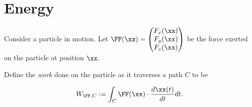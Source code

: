 \documentclass{article}
\begin{document}
\section*{Energy}







Consider a particle in motion. Let $\FF(\xx) = \begin{pmatrix} F_x(\xx) \\ F_y(\xx) \\ F_z(\xx) \end{pmatrix}$ be the force exerted on the particle at position $\xx$.

Define the \textit{work} done on the particle as it traverses a path $C$ to be

\begin{align*}
    W_{\FF, C} := \int_C \FF(\xx) \cdot \frac{d \xx(t)}{d t} dt.
\end{align*}
\end{document}
